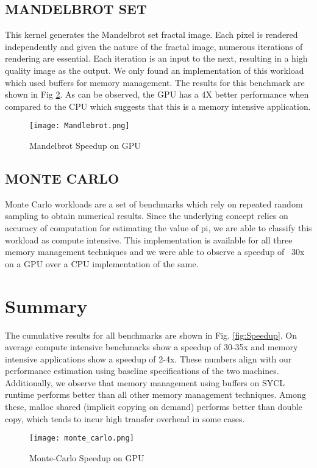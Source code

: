 \documentclass[14pt,fleqn]{article}
\begin{document}
\subsection{MANDELBROT SET}
This kernel generates the Mandelbrot set fractal image. Each pixel is rendered independently and given the nature of the fractal image, numerous iterations of rendering are essential. Each iteration is an input to the next, resulting in a high quality image as the output. We only found an implementation of this workload which used buffers for memory management. The results for this benchmark are shown in Fig \ref{fig:Mandlebrot}. As can be observed, the GPU has a 4X better performance when compared to the CPU which suggests that this is a memory intensive application.
\begin{figure}
\centering
    \texttt{[image: Mandlebrot.png]}
    \caption{Mandelbrot Speedup on GPU}
    \label{fig:Mandlebrot}
\end{figure}
\subsection{MONTE CARLO}
Monte Carlo workloads are a set of benchmarks which rely on repeated random sampling to obtain numerical results. Since the underlying concept relies on accuracy of computation for estimating the value of pi, we are able to classify this workload as compute intensive. This implementation is available for all three memory management techniques and we were able to observe a speedup of ~30x on a GPU over a CPU implementation of the same. \\
\section{Summary}
The cumulative results for all benchmarks are shown in Fig. \ref{fig:Speedup}. On average compute intensive benchmarks show a speedup of 30-35x and memory intensive applications show a speedup of 2-4x. These numbers align with our performance estimation using baseline specifications of the two machines. Additionally, we observe that memory management using buffers on SYCL runtime performs better than all other memory management techniques. Among these, malloc shared (implicit copying on demand) performs better than double copy, which tends to incur high transfer overhead in some cases.
\begin{figure}
\centering
    \texttt{[image: monte\_carlo.png]}
    \caption{Monte-Carlo Speedup on GPU}
    \label{fig:Mandlebrot}
\end{figure}
\end{document}
